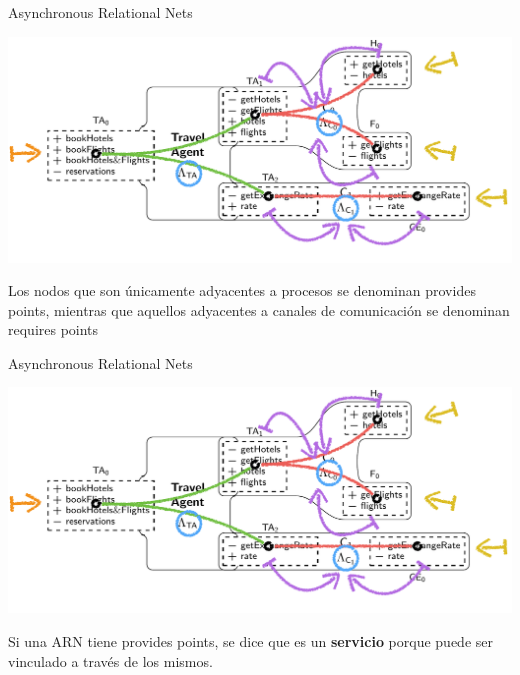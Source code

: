 \documentclass[10pt,xcolor={table,dvipsnames},t]{beamer}
\begin{document}
\begin{frame}{Asynchronous Relational Nets \cite{fiadeiro:fase2011}}
 \vspace{\fill}
\begin{center}
\includegraphics[scale=0.5]{images/ARN4.png}
\end{center}
 \vspace{\fill}
Los nodos que son únicamente adyacentes a \textcolor{proc}{procesos} se denominan \textcolor{prov}{provides points}, mientras que aquellos adyacentes a \textcolor{com}{canales de comunicación} se denominan \textcolor{req}{requires points}  
 \vspace{\fill}
\end{frame}

\begin{frame}{Asynchronous Relational Nets \cite{fiadeiro:fase2011}}
 \vspace{\fill}
\begin{center}
\includegraphics[scale=0.5]{images/ARN4.png}
\end{center}
 \vspace{\fill}
Si una ARN tiene \textcolor{prov}{provides points}, se dice que es un \textbf{servicio} porque puede ser vinculado a través de los mismos.
 \vspace{\fill}
\end{frame}
\end{document}
